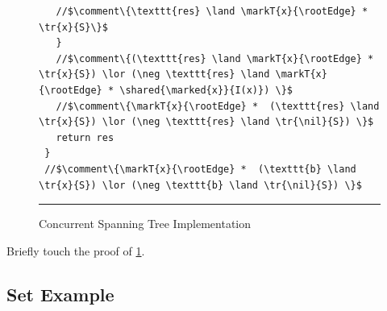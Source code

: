\begin{figure}
\begin{lstlisting}
   //$\comment\{\texttt{res} \land \markT{x}{\rootEdge} *  \tr{x}{S}\}$      
   }		
   //$\comment\{(\texttt{res} \land \markT{x}{\rootEdge} * \tr{x}{S}) \lor (\neg \texttt{res} \land \markT{x}{\rootEdge} * \shared{\marked{x}}{I(x)}) \}$   
   //$\comment\{\markT{x}{\rootEdge} *  (\texttt{res} \land \tr{x}{S}) \lor (\neg \texttt{res} \land \tr{\nil}{S}) \}$      
   return res
 }
 //$\comment\{\markT{x}{\rootEdge} *  (\texttt{b} \land \tr{x}{S}) \lor (\neg \texttt{b} \land \tr{\nil}{S}) \}$      
\end{lstlisting}
\hrule\vspace*{5pt}
\caption{Concurrent Spanning Tree Implementation}
\label{fig:conSpanningTree}
\end{figure}
%

\todo Briefly touch the proof of \fig\ref{fig:conSpanningTree}.

\subsection{Set Example}
